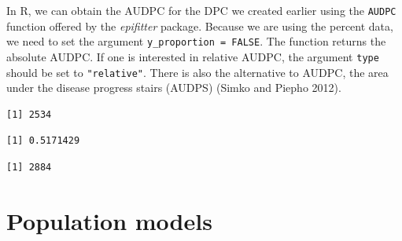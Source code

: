 \documentclass[
  letterpaper,
]{book}
\newenvironment{Shaded}{\begin{snugshade}}{\end{snugshade}}
\newcommand{\AttributeTok}[1]{\textcolor[rgb]{0.40,0.45,0.13}{#1}}
\newcommand{\CommentTok}[1]{\textcolor[rgb]{0.37,0.37,0.37}{#1}}
\newcommand{\ConstantTok}[1]{\textcolor[rgb]{0.56,0.35,0.01}{#1}}
\newcommand{\FunctionTok}[1]{\textcolor[rgb]{0.28,0.35,0.67}{#1}}
\newcommand{\NormalTok}[1]{\textcolor[rgb]{0.00,0.23,0.31}{#1}}
\newcommand{\SpecialCharTok}[1]{\textcolor[rgb]{0.37,0.37,0.37}{#1}}
\newcommand{\StringTok}[1]{\textcolor[rgb]{0.13,0.47,0.30}{#1}}
\begin{document}
In R, we can obtain the AUDPC for the DPC we created earlier using the
\texttt{AUDPC} function offered by the \emph{epifitter} package. Because
we are using the percent data, we need to set the argument
\texttt{y\_proportion\ =\ FALSE}. The function returns the absolute
AUDPC. If one is interested in relative AUDPC, the argument
\texttt{type} should be set to \texttt{"relative"}. There is also the
alternative to AUDPC, the area under the disease progress stairs (AUDPS)
(Simko and Piepho 2012).

\begin{Shaded}
\end{Shaded}

\begin{verbatim}
[1] 2534
\end{verbatim}

\begin{Shaded}
\end{Shaded}

\begin{verbatim}
[1] 0.5171429
\end{verbatim}

\begin{Shaded}
\end{Shaded}

\begin{verbatim}
[1] 2884
\end{verbatim}

\hypertarget{population-models}{%
\chapter{Population models}\label{population-models}}
\end{document}
